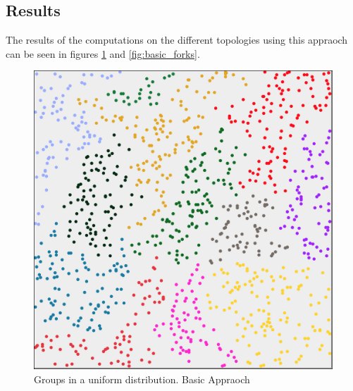 \subsection{Results}
The results of the computations on the different topologies using this appraoch can be seen in figures \ref{fig:basic_uniform} and  \ref{fig:basic_forks}.
 
\begin{figure}[h]
	\center
	\includegraphics[scale=0.35]{Images/computations/BASIC500x500_1000n.jpg}
	\caption{Groups in a uniform distribution. Basic Appraoch}
	\label{fig:basic_uniform}
\end{figure}


